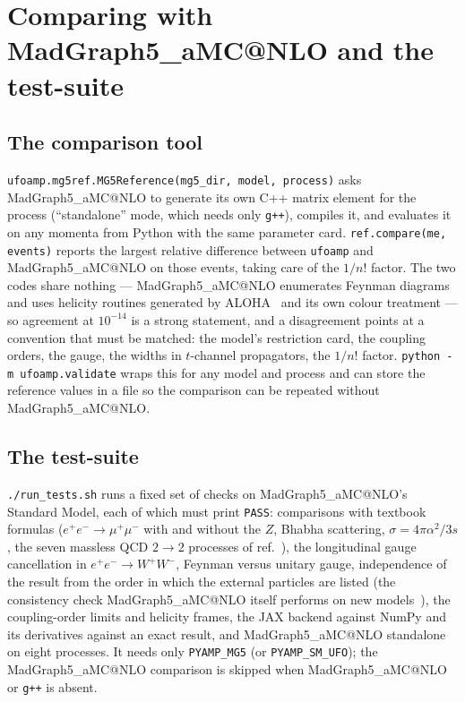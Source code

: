 \documentclass[11pt]{article}
\makeatletter
\newcommand{\ufoamp}{\texttt{ufoamp}}
\newcommand{\mg}{MadGraph5\_aMC@NLO}
\newcommand{\code}[1]{\texttt{#1}}
\makeatother
\begin{document}
\section{Comparing with \mg{} and the test-suite}\label{sec:validation}
\subsection{The comparison tool}
\code{ufoamp.mg5ref.MG5Reference(mg5\_dir, model, process)} asks \mg{} to generate its own C++ matrix element for the process (``standalone'' mode, which needs only \code{g++}), compiles it, and evaluates it on any momenta from Python with the same parameter card. \code{ref.compare(me, events)} reports the largest relative difference between \ufoamp{} and \mg{} on those events, taking care of the $1/n!$ factor. The two codes share nothing --- \mg{} enumerates Feynman diagrams and uses helicity routines generated by ALOHA~\cite{deAquino:2011ub} and its own colour treatment --- so agreement at $10^{-14}$ is a strong statement, and a disagreement points at a convention that must be matched: the model's restriction card, the coupling orders, the gauge, the widths in $t$-channel propagators, the $1/n!$ factor. \code{python -m ufoamp.validate} wraps this for any model and process and can store the reference values in a file so the comparison can be repeated without \mg.

\subsection{The test-suite}\label{sec:tests}
\code{./run\_tests.sh} runs a fixed set of checks on \mg's Standard Model, each of which must print \code{PASS}: comparisons with textbook formulas ($e^+e^-\to\mu^+\mu^-$ with and without the $Z$, Bhabha scattering, $\sigma=4\pi\alpha^2/3s$, the seven massless QCD $2\to2$ processes of ref.~\cite{Ellis:1996mzs}), the longitudinal gauge cancellation in $e^+e^-\to W^+W^-$, Feynman versus unitary gauge, independence of the result from the order in which the external particles are listed (the consistency check \mg{} itself performs on new models~\cite{Alwall:2011uj}), the coupling-order limits and helicity frames, the JAX backend against NumPy and its derivatives against an exact result, and \mg{} standalone on eight processes. It needs only \code{PYAMP\_MG5} (or \code{PYAMP\_SM\_UFO}); the \mg{} comparison is skipped when \mg{} or \code{g++} is absent.
\end{document}
